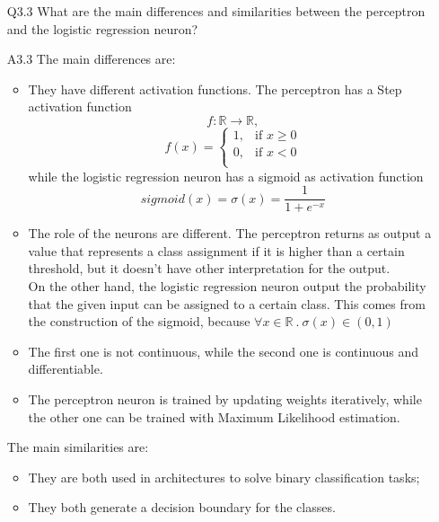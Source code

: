 \documentclass[11pt]{scrartcl}
\begin{document}
\begin{itemize}
\item[Q3.3] What are the main differences and similarities between the perceptron and the logistic regression neuron?
\item[A3.3] The main differences are:
\begin{itemize}
    \item They have different activation functions. The perceptron has a Step activation function
    $$f: \mathbb{R} \longrightarrow \mathbb{R},$$
    $$f(x) = 
        \begin{cases}
          1, & \text{if $x \ge 0$}\\
          0, & \text{if $x < 0 $}\\
        \end{cases}
    $$
    while the logistic regression neuron has a sigmoid as activation function
    $$sigmoid(x) = \sigma(x) = \frac{1}{1 + e^{-x}}$$
    \item The role of the neurons are different. The perceptron returns as output a value that represents a class assignment if it is higher than a certain threshold, but it doesn't have other interpretation for the output. \\
    On the other hand, the logistic regression neuron output the probability that the given input can be assigned to a certain class. This comes from the construction of the sigmoid, because $\forall x \in \mathbb{R}\ .\ \sigma(x) \in (0, 1)$
    \item The first one is not continuous, while the second one is continuous and differentiable.
    \item The perceptron neuron is trained by updating weights iteratively, while the other one can be trained with Maximum Likelihood estimation.
\end{itemize}

The main similarities are:
\begin{itemize}
    \item They are both used in architectures to solve binary classification tasks;
    \item They both generate a decision boundary for the classes.
\end{itemize} 

\end{itemize}
\end{document}
